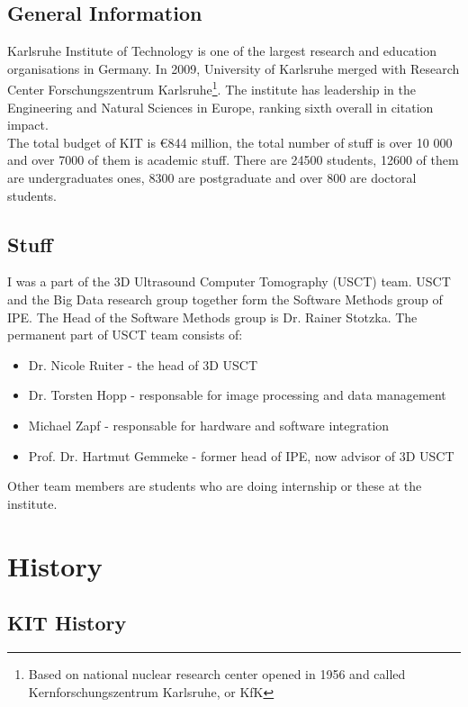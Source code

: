 \documentclass[english]{article}
\begin{document}
\subsection{General Information}

Karlsruhe Institute of Technology is one of the largest research and education organisations in Germany. In 2009, University of Karlsruhe merged with Research Center Forschungszentrum Karlsruhe\footnote{Based on national nuclear research center opened in 1956 and called Kernforschungszentrum Karlsruhe, or KfK}. The institute has leadership in the Engineering and Natural Sciences in Europe, ranking sixth overall in citation impact.\\

The total budget of KIT is \euro 844 million, the total number of stuff is over 10 000 and over 7000 of them is academic stuff. There are 24500 students, 12600 of them are undergraduates ones, 8300 are postgraduate and over 800 are doctoral students.
\subsection{Stuff}

I was a part of the 3D Ultrasound Computer Tomography (USCT) team. USCT and the Big Data research group together form the Software Methods group of IPE. The Head of the Software Methods group is Dr. Rainer Stotzka. The permanent part of USCT team consists of:

\begin{itemize}
\item Dr. Nicole Ruiter - the head of 3D USCT
\item Dr. Torsten Hopp - responsable for image processing and data management
\item Michael Zapf - responsable for hardware and software integration
\item Prof. Dr. Hartmut Gemmeke - former head of IPE, now advisor of 3D USCT
\end{itemize}

Other team members are students who are doing internship or these at the institute.

\section{History}

\subsection{KIT History}
\end{document}
